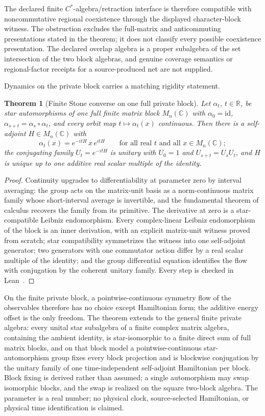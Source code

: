 \documentclass[11pt]{article}
\newtheorem{theorem}{Theorem}[section]
\begin{document}
The declared finite \(C^*\)-algebra/retraction interface is therefore
compatible with noncommutative regional coexistence through the displayed
character-block witness. The obstruction excludes the full-matrix and
anticommuting presentations stated in the theorem; it does not classify every
possible coexistence presentation. The declared overlap algebra is a proper
subalgebra of the set intersection of the two block algebras, and genuine
coverage semantics or regional-factor receipts for a source-produced net are
not supplied.

Dynamics on the private block carries a matching rigidity statement.

\begin{theorem}[Finite Stone converse on one full private block]
\label{thm:finite-stone-converse}
Let \(\alpha_t\), \(t\in\mathbb R\), be star automorphisms of one full
finite matrix block \(M_n(\mathbb C)\) with \(\alpha_0=\mathrm{id}\),
\(\alpha_{s+t}=\alpha_s\circ\alpha_t\), and every orbit map
\(t\mapsto\alpha_t(x)\) continuous. Then there is a self-adjoint
\(H\in M_n(\mathbb C)\) with
\[
\alpha_t(x)=e^{-itH}\,x\,e^{itH}
\qquad\text{for all real }t\text{ and all }x\in M_n(\mathbb C);
\]
the conjugating family \(U_t=e^{-itH}\) is unitary with
\(U_0=1\) and \(U_{s+t}=U_sU_t\), and \(H\) is unique up to one additive
real scalar multiple of the identity.
\end{theorem}

\begin{proof}
Continuity upgrades to differentiability at parameter zero by interval
averaging: the group acts on the matrix-unit basis as a norm-continuous
matrix family whose short-interval average is invertible, and the
fundamental theorem of calculus recovers the family from its primitive.
The derivative at zero is a star-compatible Leibniz endomorphism. Every
complex-linear Leibniz endomorphism of the block is an inner derivation,
with an explicit matrix-unit witness proved from scratch; star
compatibility symmetrizes the witness into one self-adjoint generator;
two generators with one commutator action differ by a real scalar
multiple of the identity; and the group differential equation identifies
the flow with conjugation by the coherent unitary family. Every step is
checked in Lean~\cite{ophrepo}.
\end{proof}

On the finite private block, a pointwise-continuous symmetry flow of the
observables therefore has no choice except Hamiltonian form; the additive
energy offset is the only freedom. The theorem extends to the general
finite private algebra: every unital star subalgebra of a finite complex
matrix algebra, containing the ambient identity, is star-isomorphic to a
finite direct sum of full matrix blocks,
and on that block model a pointwise-continuous star-automorphism group
fixes every block projection and is blockwise conjugation by the unitary
family of one time-independent self-adjoint Hamiltonian per block. Block
fixing is derived rather than assumed; a single automorphism may swap
isomorphic blocks, and the swap is realized on the square two-block
algebra. The parameter is a real number; no physical clock,
source-selected Hamiltonian, or physical time identification is claimed.
\end{document}
